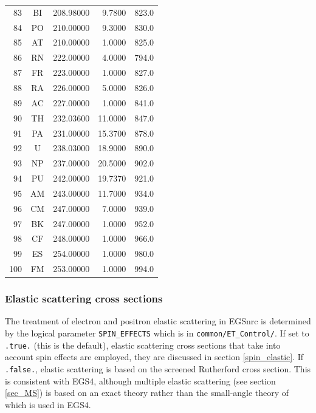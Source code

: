\begin{longtable}{|rcrrr|}
83 & BI     &208.98000 &  9.7800    &823.0 \\
84 & PO     &210.00000 &  9.3000    &830.0 \\
85 & AT     &210.00000 &  1.0000    &825.0 \\
86 & RN     &222.00000 &  4.0000    &794.0 \\
87 & FR     &223.00000 &  1.0000    &827.0 \\
88 & RA     &226.00000 &  5.0000    &826.0 \\
89 & AC     &227.00000 &  1.0000    &841.0 \\
90 & TH     &232.03600 & 11.0000    &847.0 \\
91 & PA     &231.00000 & 15.3700    &878.0 \\
92 & U      &238.03000 & 18.9000    &890.0 \\
93 & NP     &237.00000 & 20.5000    &902.0 \\
94 & PU     &242.00000 & 19.7370    &921.0 \\
95 & AM     &243.00000 & 11.7000    &934.0 \\
96 & CM     &247.00000 &  7.0000    &939.0 \\
97 & BK     &247.00000 &  1.0000    &952.0 \\
98 & CF     &248.00000 &  1.0000    &966.0 \\
99 & ES     &254.00000 &  1.0000    &980.0 \\
100& FM     &253.00000 &  1.0000    &994.0 \\
\end{longtable}
  
\subsubsection{Elastic scattering cross sections}
\label{elastic}
\setcounter{equation}{0}

The treatment of electron and positron elastic 
scattering in EGSnrc is determined by the logical parameter 
{\tt SPIN\_EFFECTS} which is in {\tt common/ET\_Control/}. 
If set to {\tt .true.} (this is the default), 
elastic scattering cross sections 
that take into account spin effects are employed, they 
are discussed in section \ref{spin_elastic}. If {\tt .false.}, 
elastic scattering is based on the screened Rutherford cross section. 
This is consistent with EGS4, although multiple elastic 
scattering (see section \ref{sec_MS}) 
is based on an exact theory rather than the 
small-angle theory of \Mol \cite{Mo48} which is used in EGS4. 

